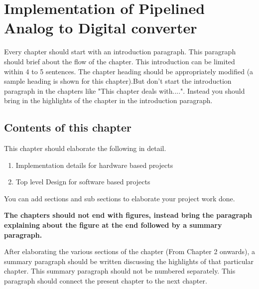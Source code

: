 \chapter{Implementation of Pipelined Analog to Digital converter}

Every chapter should start with an introduction paragraph. This paragraph should brief about the flow of the chapter. This introduction can be limited within 4 to 5 sentences. The chapter heading should be appropriately modified (a sample heading is shown for this chapter).But don't start the introduction paragraph in the chapters like "This chapter deals with....". Instead you should bring in the highlights of the chapter in the introduction paragraph. 

\section{Contents of this chapter}
This chapter should elaborate the following in detail.
\begin{enumerate}
\item Implementation details for hardware based projects
\item Top level Design for software based projects
\end{enumerate}

You can add sections and sub sections to elaborate your project work done.

\vspace{0.75cm}

 \textbf{The chapters should not end with figures, instead bring the paragraph explaining about the figure at the end followed by a summary paragraph.}

After elaborating the various sections of the chapter (From Chapter 2 onwards), a summary paragraph should be written discussing the highlights of that particular chapter. This summary paragraph should not be numbered separately. This paragraph should connect the present chapter to the next chapter. 

